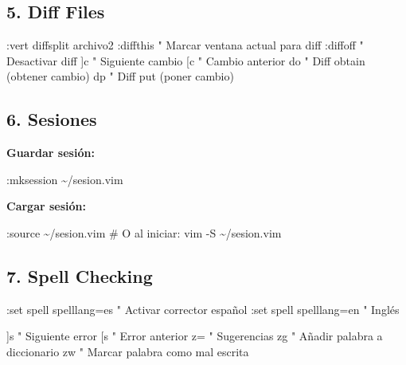 \documentclass[
  doc,
  floatsintext,
  longtable,
  a4paper,
  nolmodern,
  notxfonts,
  notimes,
  12pt,
  colorlinks=true,linkcolor=blue,citecolor=blue,urlcolor=blue]{apa7}
\newenvironment{Shaded}{\begin{snugshade}}{\end{snugshade}}
\newcommand{\NormalTok}[1]{\textcolor[rgb]{0.00,0.23,0.31}{#1}}
\begin{document}
\subsection{5. Diff Files}\label{diff-files}

\begin{Shaded}
\begin{Highlighting}[]
\NormalTok{:vert diffsplit archivo2}
\NormalTok{:diffthis       " Marcar ventana actual para diff}
\NormalTok{:diffoff        " Desactivar diff}
\NormalTok{]c              " Siguiente cambio}
\NormalTok{[c              " Cambio anterior}
\NormalTok{do              " Diff obtain (obtener cambio)}
\NormalTok{dp              " Diff put (poner cambio)}
\end{Highlighting}
\end{Shaded}

\subsection{6. Sesiones}\label{sesiones}

\textbf{Guardar sesión:}

\begin{Shaded}
\begin{Highlighting}[]
\NormalTok{:mksession \textasciitilde{}/sesion.vim}
\end{Highlighting}
\end{Shaded}

\textbf{Cargar sesión:}

\begin{Shaded}
\begin{Highlighting}[]
\NormalTok{:source \textasciitilde{}/sesion.vim}
\NormalTok{\# O al iniciar:}
\NormalTok{vim {-}S \textasciitilde{}/sesion.vim}
\end{Highlighting}
\end{Shaded}

\subsection{7. Spell Checking}\label{spell-checking}

\begin{Shaded}
\begin{Highlighting}[]
\NormalTok{:set spell spelllang=es    " Activar corrector español}
\NormalTok{:set spell spelllang=en    " Inglés}

\NormalTok{]s      " Siguiente error}
\NormalTok{[s      " Error anterior}
\NormalTok{z=      " Sugerencias}
\NormalTok{zg      " Añadir palabra a diccionario}
\NormalTok{zw      " Marcar palabra como mal escrita}
\end{Highlighting}
\end{Shaded}
\end{document}
